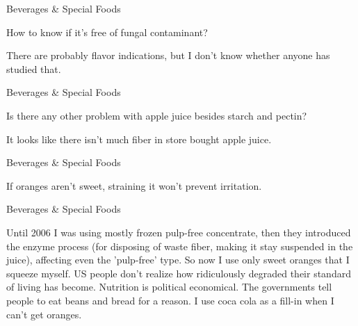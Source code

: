 \documentclass[11pt,oneside,openany,extrafontsizes]{memoir}
\begin{document}
\begin{qaexchange}{Beverages \& Special Foods}

    \begin{question}
        How to know if it's free of fungal contaminant?
    \end{question}

    \begin{answer}
        There are probably flavor indications, but I don't know whether anyone has studied that.
    \end{answer}
\end{qaexchange}

\begin{qaexchange}{Beverages \& Special Foods}

    \begin{question}
        Is there any other problem with apple juice besides starch and pectin?
    \end{question}

    \begin{answer}
        It looks like there isn't much fiber in store bought apple juice.
    \end{answer}
\end{qaexchange}

\begin{standalonequote}{Beverages \& Special Foods}

    \begin{answer}
        If oranges aren't sweet, straining it won't prevent irritation.
    \end{answer}
\end{standalonequote}

\begin{standalonequote}{Beverages \& Special Foods}

    \begin{answer}
        Until 2006 I was using mostly frozen pulp-free concentrate, then they introduced the enzyme process (for disposing of waste fiber, making it stay suspended in the juice), affecting even the 'pulp-free' type. So now I use only sweet oranges that I squeeze myself. US people don't realize how ridiculously degraded their standard of living has become. Nutrition is political economical. The governments tell people to eat beans and bread for a reason. I use coca cola as a fill-in when I can't get oranges.
    \end{answer}
\end{standalonequote}
\end{document}
